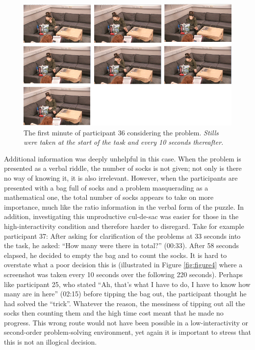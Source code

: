 \documentclass[twocolumn, issue, empirical, authordate,drafn]{jote-new-article}
\begin{document}
\begin{figure}

 \includegraphics[width=\columnwidth]{media/image3.png} 
\caption{The first minute of participant 36 considering the problem. \emph{Stills were taken at the start of the task and every 10 seconds thereafter.}}
\label{fig:figure3}
\end{figure}


Additional information was deeply unhelpful in this case. When the problem is presented as a verbal riddle, the number of socks is not given; not only is there no way of knowing it, it is also irrelevant. However, when the participants are presented with a bag full of socks and a problem masquerading as a mathematical one, the total number of socks appears to take on more importance, much like the ratio information in the verbal form of the puzzle. In addition, investigating this unproductive cul-de-sac was easier for those in the high-interactivity condition and therefore harder to disregard. Take for example participant 37: After asking for clarification of the problems at 33 seconds into the task, he asked: ``How many were there in total?'' (00:33). After 58 seconds elapsed, he decided to empty the bag and to count the socks. It is hard to overstate what a poor decision this is (illustrated in Figure \ref{fig:figure4} where a screenshot was taken every 10 seconds over the following 220 seconds). Perhaps like participant 25, who stated ``Ah, that's what I have to do, I have to know how many are in here'' (02:15) before tipping the bag out, the participant thought he had solved the ``trick''. Whatever the reason, the messiness of tipping out all the socks then counting them and the high time cost meant that he made no progress. This wrong route would not have been possible in a low-interactivity or second-order problem-solving environment, yet again it is important to stress that this is not an illogical decision. 
\end{document}

